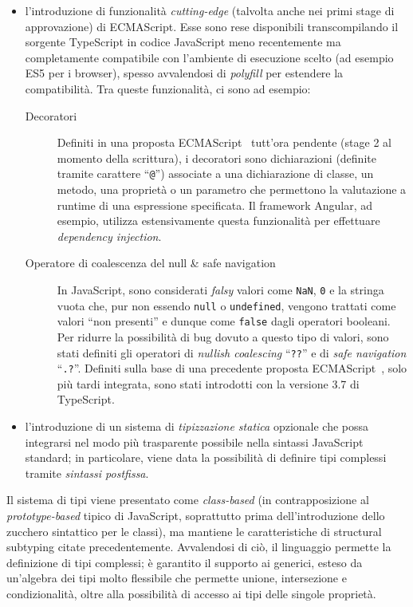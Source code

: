       \begin{itemize}
        \item
          l'introduzione di funzionalità \emph{cutting-edge} (talvolta anche nei primi stage di approvazione) di ECMAScript.
          Esse sono rese disponibili transcompilando il sorgente TypeScript in codice JavaScript meno recentemente ma completamente compatibile con l'ambiente di esecuzione scelto
          (ad esempio ES5 per i browser), spesso avvalendosi di \emph{polyfill} per estendere la compatibilità.
          Tra queste funzionalità, ci sono ad esempio:
          \begin{description}
            \item[Decoratori]
              Definiti in una proposta ECMAScript~\cite{decorators} tutt'ora pendente (stage 2 al momento della scrittura),
              i decoratori sono dichiarazioni (definite tramite carattere ``\texttt{@}'') associate a una dichiarazione di classe, un metodo, una proprietà o un parametro che permettono la valutazione a runtime di una espressione specificata.
              Il framework Angular, ad esempio, utilizza estensivamente questa funzionalità per effettuare \emph{dependency injection}.

            \item[Operatore di coalescenza del null \& safe navigation]
              In JavaScript, sono considerati \emph{falsy} valori come \texttt{NaN}, \texttt{0} e la stringa vuota che, pur non essendo \texttt{null} o \texttt{undefined},
              vengono trattati come valori ``non presenti'' e dunque come \texttt{false} dagli operatori booleani.
              Per ridurre la possibilità di bug dovuto a questo tipo di valori, sono stati definiti gli operatori di \emph{nullish coalescing} ``\texttt{??}'' e di \emph{safe navigation} ``\texttt{.?}''.
              Definiti sulla base di una precedente proposta ECMAScript~\cite{optional}, solo più tardi integrata, sono stati introdotti con la versione 3.7 di TypeScript.
          \end{description}
        \item
          l'introduzione di un sistema di \emph{tipizzazione statica} opzionale che possa integrarsi nel modo più trasparente possibile nella sintassi JavaScript standard;
          in particolare, viene data la possibilità di definire tipi complessi tramite \emph{sintassi postfissa}.
      \end{itemize}

      Il sistema di tipi viene presentato come \emph{class-based} (in contrapposizione al \emph{prototype-based} tipico di JavaScript, soprattutto prima dell'introduzione dello zucchero sintattico per le classi), ma mantiene le caratteristiche di structural subtyping citate precedentemente.
      Avvalendosi di ciò, il linguaggio permette la definizione di tipi complessi;
      è garantito il supporto ai generici, esteso da un'algebra dei tipi molto flessibile che permette unione, intersezione e condizionalità, oltre alla possibilità di accesso ai tipi delle singole proprietà.

